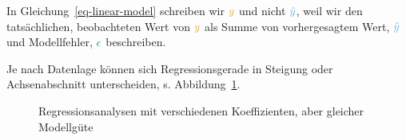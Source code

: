 \documentclass[
  letterpaper,
  oneside,
  open=any]{scrbook}
\theoremstyle{definition}
\theoremstyle{definition}
\theoremstyle{definition}
\theoremstyle{remark}
\begin{document}
In Gleichung~\ref{eq-linear-model} schreiben wir \(\color{ycol}{y}\) und
nicht \(\color{modelcol}{\hat{y}}\), weil wir den tatsächlichen,
beobachteten Wert von \(\color{ycol}{y}\) als Summe von vorhergesagtem
Wert, \(\color{modelcol}{\hat{y}}\) und Modellfehler,
\(\color{errorcol}{\epsilon}\) beschreiben.

Je nach Datenlage können sich Regressionsgerade in Steigung oder
Achsenabschnitt unterscheiden, s. Abbildung~\ref{fig-regr-div}.

\begin{figure}

\begin{minipage}{0.50\linewidth}



\end{minipage}%
%
\begin{minipage}{0.50\linewidth}



\end{minipage}%

\caption{\label{fig-regr-div}Regressionsanalysen mit verschiedenen
Koeffizienten, aber gleicher Modellgüte}

\end{figure}%
\end{document}

